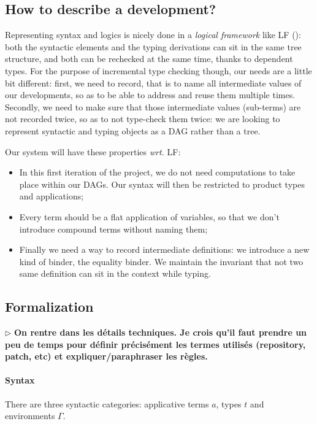 \documentclass{article}
\newcommand{\remplan}[1]{\noindent\textcolor{bwblue}{$\triangleright$ \textbf{#1}}}
\begin{document}
\subsection{How to describe a development?}

Representing syntax and logics is nicely done in a \emph{logical
  framework} like LF (\cite{harper1993framework}): both the syntactic
elements and the typing derivations can sit in the same tree
structure, and both can be rechecked at the same time, thanks to
dependent types. For the purpose of incremental type checking though,
our needs are a little bit different: first, we need to record, that
is to name all intermediate values of our developments, so as to be
able to address and reuse them multiple times. Secondly, we need to
make sure that those intermediate values (sub-terms) are not recorded
twice, so as to not type-check them twice: we are looking to represent
syntactic and typing objects as a DAG rather than a tree.

Our system will have these properties \emph{wrt.} LF:
\begin{itemize}
\item In this first iteration of the project, we do not need
  computations to take place within our DAGs. Our syntax will then be
  restricted to product types and applications;
\item Every term should be a flat application of variables, so that we
  don't introduce compound terms without naming them;
\item Finally we need a way to record intermediate definitions: we
  introduce a new kind of binder, the equality binder. We maintain the
  invariant that not two same definition can sit in the context while
  typing.
\end{itemize}

\subsection{Formalization}

\remplan{On rentre dans les détails techniques. Je crois qu'il faut
  prendre un peu de temps pour définir précisément les termes utilisés
  (repository, patch, etc) et expliquer/paraphraser les règles.}

\paragraph{Syntax} There are three syntactic categories: applicative
terms $a$, types $t$ and environments $\Gamma$.
\end{document}
